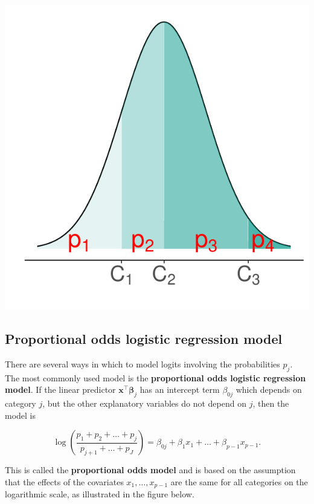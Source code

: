 \documentclass[
  letterpaper,
  DIV=11,
  numbers=noendperiod]{scrartcl}
\begin{document}
\begin{center}
\includegraphics{about_files/figure-pdf/unnamed-chunk-1-1.pdf}
\end{center}

\subsection{Proportional odds logistic regression
model}\label{proportional-odds-logistic-regression-model}

There are several ways in which to model logits involving the
probabilities \(p_j\). The most commonly used model is the
\textbf{proportional odds logistic regression model}. If the linear
predictor \(\boldsymbol{x}^\intercal \boldsymbol{\beta}_j\) has an
intercept term \(\beta_{0j}\) which depends on category \(j\), but the
other explanatory variables do not depend on \(j\), then the model is

\[
\log \left(\frac{p_1+p_2+\dots+p_j}{p_{j+1}+\dots+p_J}\right)=\beta_{0j}+\beta_1 x_1 + \dots + \beta_{p-1}x_{p-1}. 
\]

This is called the \textbf{proportional odds model} and is based on the
assumption that the effects of the covariates \(x_1,\dots, x_{p-1}\) are
the same for all categories on the logarithmic scale, as illustrated in
the figure below.
\end{document}

